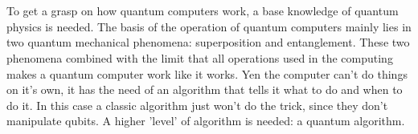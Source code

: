 \chapter{}
\label{ch:stand-van-zaken}






To get a grasp on how quantum computers work, a base knowledge of quantum physics is needed.
The basis of the operation of quantum computers mainly lies in two quantum mechanical phenomena: superposition and entanglement.
These two phenomena combined with the limit that all operations used in the computing makes a quantum computer work like it works.
Yen the computer can't do things on it's own, it has the need of an algorithm that tells it what to do and when to do it.
In this case a classic algorithm just won't do the trick, since they don't manipulate qubits. A higher 'level' of algorithm is needed: a quantum algorithm.


